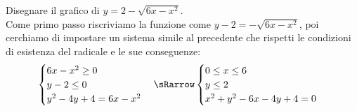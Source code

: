 \begin{esempio}
\begin{minipage}{.3\textwidth}
  \end{minipage}

\end{esempio}

\begin{esempio} Disegnare il grafico di $y=2-\sqrt{6x-x^{2}} $.\\[7pt]Come primo passo riscriviamo la 
funzione come $y-2=-\sqrt{6x-x^{2}}  $, poi cerchiamo di impostare un 
sistema simile al precedente che rispetti le condizioni di esistenza del 
radicale e le sue conseguenze:
\[\begin{cases}  6x-x^{2}\geq0   \\ y-2\leq0  \\y^{2}-4y+4=6x-x^{2} 
\end{cases} \sRarrow
\begin{cases}   0\leq x\leq6   \\ y\leq2  \\ x^{2}+y^{2}-6x-4y+4=0 
\end{cases}\]


\end{esempio}
